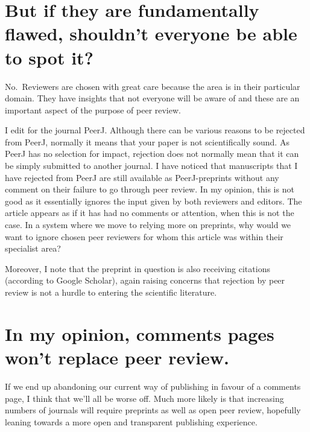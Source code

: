 \documentclass[
]{krantz}
\begin{document}
\hypertarget{but-if-they-are-fundamentally-flawed-shouldnt-everyone-be-able-to-spot-it}{%
\section{But if they are fundamentally flawed, shouldn't everyone be able to spot it?}\label{but-if-they-are-fundamentally-flawed-shouldnt-everyone-be-able-to-spot-it}}

No.~Reviewers are chosen with great care because the area is in their particular domain. They have insights that not everyone will be aware of and these are an important aspect of the purpose of peer review.

I edit for the journal PeerJ. Although there can be various reasons to be rejected from PeerJ, normally it means that your paper is not scientifically sound. As PeerJ has no selection for impact, rejection does not normally mean that it can be simply submitted to another journal. I have noticed that manuscripts that I have rejected from PeerJ are still available as PeerJ-preprints without any comment on their failure to go through peer review. In my opinion, this is not good as it essentially ignores the input given by both reviewers and editors. The article appears as if it has had no comments or attention, when this is not the case. In a system where we move to relying more on preprints, why would we want to ignore chosen peer reviewers for whom this article was within their specialist area?

Moreover, I note that the preprint in question is also receiving citations (according to Google Scholar), again raising concerns that rejection by peer review is not a hurdle to entering the scientific literature.

\hypertarget{in-my-opinion-comments-pages-wont-replace-peer-review.}{%
\section{In my opinion, comments pages won't replace peer review.}\label{in-my-opinion-comments-pages-wont-replace-peer-review.}}

If we end up abandoning our current way of publishing in favour of a comments page, I think that we'll all be worse off. Much more likely is that increasing numbers of journals will require preprints as well as open peer review, hopefully leaning towards a more open and transparent publishing experience.
\end{document}
